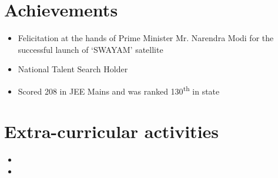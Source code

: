 \documentclass[11pt,a4paper,sans]{moderncv}        %
\begin{document}
\section{Achievements}

\vspace{3pt}

\begin{itemize}

\item{Felicitation at the hands of Prime Minister Mr. Narendra Modi for the successful launch of `SWAYAM' satellite}

\vspace{3pt}

\item{National Talent Search Holder}

\vspace{3pt}

\item{Scored 208 in JEE Mains and was ranked 130\textsuperscript{th} in state}

\vspace{3pt}


\end{itemize}

\section{Extra-curricular activities}


\vspace{4pt}
 
 \begin{itemize}

	 \item{}

	 \item{}
 \end{itemize}


 
\end{document}
